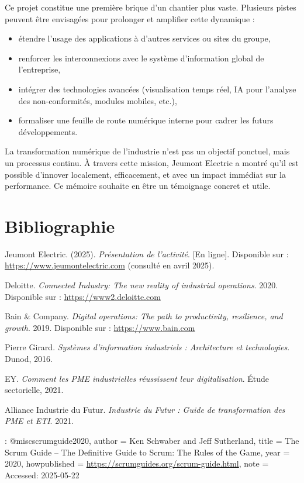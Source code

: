 \documentclass[11pt,a4paper]{article}
\begin{document}
Ce projet constitue une première brique d’un chantier plus vaste. Plusieurs pistes peuvent être envisagées pour prolonger et amplifier cette dynamique :
\begin{itemize}
    \item étendre l’usage des applications à d’autres services ou sites du groupe,
    \item renforcer les interconnexions avec le système d’information global de l’entreprise,
    \item intégrer des technologies avancées (visualisation temps réel, IA pour l’analyse des non-conformités, modules mobiles, etc.),
    \item formaliser une feuille de route numérique interne pour cadrer les futurs développements.
\end{itemize}

La transformation numérique de l’industrie n’est pas un objectif ponctuel, mais un processus continu. À travers cette mission, Jeumont Electric a montré qu’il est possible d’innover localement, efficacement, et avec un impact immédiat sur la performance. Ce mémoire souhaite en être un témoignage concret et utile.



\newpage
\section*{Bibliographie}
\begin{thebibliography}{9}

Jeumont Electric. (2025). \textit{Présentation de l’activité}. [En ligne]. Disponible sur : \url{https://www.jeumontelectric.com} (consulté en avril 2025).

Deloitte. \textit{Connected Industry: The new reality of industrial operations}. 2020. Disponible sur : \url{https://www2.deloitte.com}

Bain \& Company. \textit{Digital operations: The path to productivity, resilience, and growth}. 2019. Disponible sur : \url{https://www.bain.com}

Pierre Girard. \textit{Systèmes d'information industriels : Architecture et technologies}. Dunod, 2016.


EY. \textit{Comment les PME industrielles réussissent leur digitalisation}. Étude sectorielle, 2021.

Alliance Industrie du Futur. \textit{Industrie du Futur : Guide de transformation des PME et ETI}. 2021.

: @misc{scrumguide2020,
  author       = {Ken Schwaber and Jeff Sutherland},
  title        = {The Scrum Guide -- The Definitive Guide to Scrum: The Rules of the Game},
  year         = {2020},
  howpublished = {\url{https://scrumguides.org/scrum-guide.html}},
  note         = {Accessed: 2025-05-22}
}

\end{thebibliography}
\end{document}
